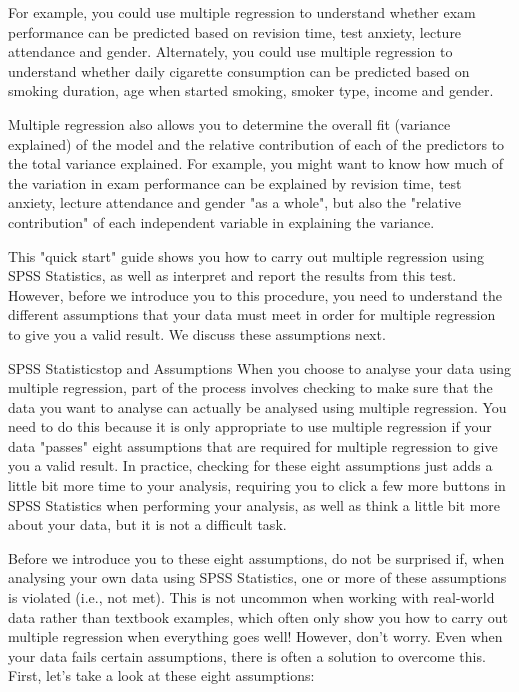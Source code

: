 \documentclass[]{article}
\begin{document}
	For example, you could use multiple regression to understand whether exam performance can be predicted based on revision time, test anxiety, lecture attendance and gender. Alternately, you could use multiple regression to understand whether daily cigarette consumption can be predicted based on smoking duration, age when started smoking, smoker type, income and gender.
	
	Multiple regression also allows you to determine the overall fit (variance explained) of the model and the relative contribution of each of the predictors to the total variance explained. For example, you might want to know how much of the variation in exam performance can be explained by revision time, test anxiety, lecture attendance and gender "as a whole", but also the "relative contribution" of each independent variable in explaining the variance.
	
	This "quick start" guide shows you how to carry out multiple regression using SPSS Statistics, as well as interpret and report the results from this test. However, before we introduce you to this procedure, you need to understand the different assumptions that your data must meet in order for multiple regression to give you a valid result. We discuss these assumptions next.
	
	SPSS Statisticstop and
	Assumptions
	When you choose to analyse your data using multiple regression, part of the process involves checking to make sure that the data you want to analyse can actually be analysed using multiple regression. You need to do this because it is only appropriate to use multiple regression if your data "passes" eight assumptions that are required for multiple regression to give you a valid result. In practice, checking for these eight assumptions just adds a little bit more time to your analysis, requiring you to click a few more buttons in SPSS Statistics when performing your analysis, as well as think a little bit more about your data, but it is not a difficult task.
	
	Before we introduce you to these eight assumptions, do not be surprised if, when analysing your own data using SPSS Statistics, one or more of these assumptions is violated (i.e., not met). This is not uncommon when working with real-world data rather than textbook examples, which often only show you how to carry out multiple regression when everything goes well! However, don’t worry. Even when your data fails certain assumptions, there is often a solution to overcome this. First, let's take a look at these eight assumptions:
	
\end{document}
